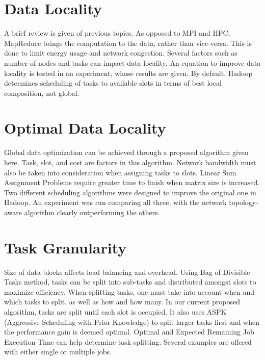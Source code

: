 
\section{Data Locality}

A brief review is given of previous topics. As opposed to MPI and HPC,
MapReduce brings the computation to the data, rather than vice-versa.
This is done to limit energy usage and network congestion. Several
factors such as number of nodes and tasks can impact data locality. An
equation to improve data locality is tested in an experiment, whose
results are given. By default, Hadoop determines scheduling of tasks to
available slots in terms of best local composition, not global.



\section{Optimal Data Locality}

Global data optimization can be achieved through a proposed algorithm
given here. Task, slot, and cost are factors in this algorithm. Network
bandwidth must also be taken into consideration when assigning tasks to
slots. Linear Sum Assignment Problems require greater time to finish
when matrix size is increased. Two different scheduling algorithms were
designed to improve the original one in Hadoop. An experiment was run
comparing all three, with the network topology-aware algorithm clearly
outperforming the others.



\section{Task Granularity}

Size of data blocks affects load balancing and overhead. Using Bag of
Divisible Tasks method, tasks can be split into sub-tasks and
distributed amongst slots to maximize efficiency. When splitting tasks,
one must take into account when and which tasks to split, as well as how
and how many. In our current proposed algorithm, tasks are split until
each slot is occupied. It also uses ASPK (Aggressive Scheduling with
Prior Knowledge) to split larger tasks first and when the performance
gain is deemed optimal. Optimal and Expected Remaining Job Execution
Time can help determine task splitting. Several examples are offered
with either single or multiple jobs.

